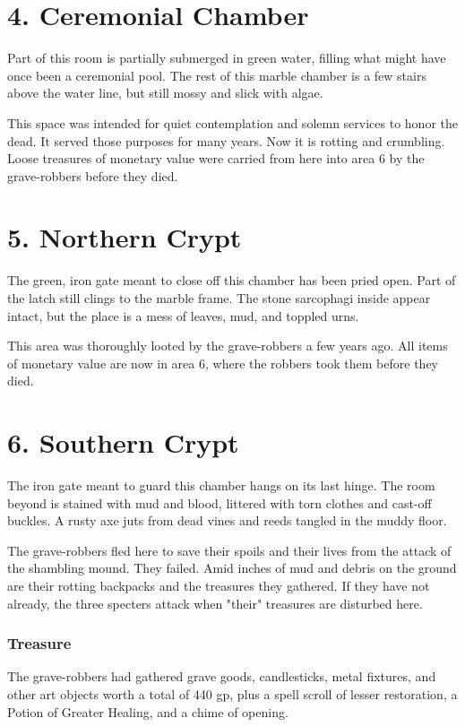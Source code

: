 \documentclass[10pt,a4paper,twoside,twocolumn,openany,bg=print,nodeprecatedcode]{dndbook}
\begin{document}
\section{4. Ceremonial Chamber}
\begin{DndReadAloud}{}
Part of this room is partially submerged in green water, filling what might have once been a ceremonial pool. The rest of this marble chamber is a few stairs above the water line, but still mossy and slick with algae.
\end{DndReadAloud}

This space was intended for quiet contemplation and solemn services to honor the dead. It served those purposes for many years. Now it is rotting and crumbling. Loose treasures of monetary value were carried from here into area 6 by the grave-robbers before they died.
\section{5. Northern Crypt}
\begin{DndReadAloud}{}
The green, iron gate meant to close off this chamber has been pried open. Part of the latch still clings to the marble frame. The stone sarcophagi inside appear intact, but the place is a mess of leaves, mud, and toppled urns.
\end{DndReadAloud}

This area was thoroughly looted by the grave-robbers a few years ago. All items of monetary value are now in area 6, where the robbers took them before they died.
\section{6. Southern Crypt}
\begin{DndReadAloud}{}
The iron gate meant to guard this chamber hangs on its last hinge. The room beyond is stained with mud and blood, littered with torn clothes and cast-off buckles. A rusty axe juts from dead vines and reeds tangled in the muddy floor.
\end{DndReadAloud}

The grave-robbers fled here to save their spoils and their lives from the attack of the shambling mound. They failed. Amid inches of mud and debris on the ground are their rotting backpacks and the treasures they gathered.
If they have not already, the three specters attack when "their" treasures are disturbed here.
\subsubsection{Treasure}
The grave-robbers had gathered grave goods, candlesticks, metal fixtures, and other art objects worth a total of 440 gp, plus a spell scroll of lesser restoration, a Potion of Greater Healing, and a chime of opening.
\end{document}

